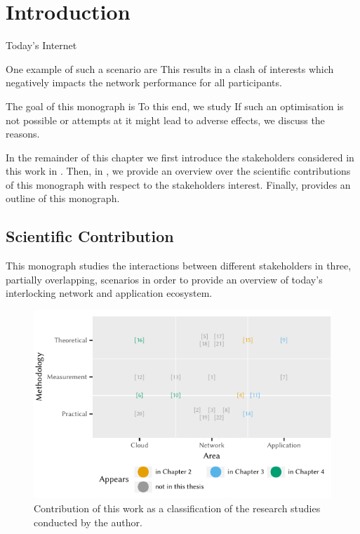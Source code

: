 \chapter{Introduction}\label{chap:introduction}

Today's Internet

One example of such a scenario are
This results in a clash of interests which negatively impacts the network performance for all participants.

The goal of this monograph is
To this end, we study
If such an optimisation is not possible or attempts at it might lead to adverse effects, we discuss the reasons.

In the remainder of this chapter we first introduce the stakeholders considered in this work in .
Then, in , we provide an overview over the scientific contributions of this monograph with respect to the stakeholders interest.
Finally,  provides an outline of this monograph.



\section{Scientific Contribution}\label{sec:introduction:scientific_contribution}
This monograph studies the interactions between different stakeholders in three, partially overlapping, scenarios in order to provide an overview of today's interlocking network and application ecosystem.

\begin{figure}
\centering
\includegraphics{figures/publications}
\caption{Contribution of this work as a classification of the research studies conducted by the author.}\label{fig:introduction:publications}
\end{figure}


